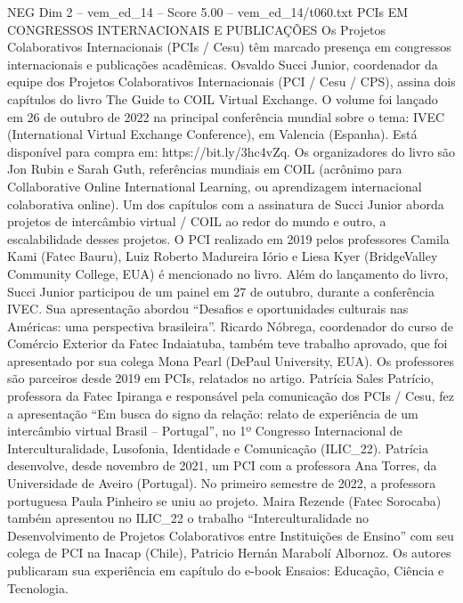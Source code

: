 \begin{textsample}{NEG Dim 2 – vem\_ed\_14 – Score 5.00 – vem\_ed\_14/t060.txt}  \label{ex:f2_neg_072}
PCIs EM CONGRESSOS INTERNACIONAIS E PUBLICAÇÕES Os Projetos Colaborativos Internacionais (PCIs / Cesu) têm marcado presença em congressos internacionais e publicações acadêmicas.
Osvaldo Succi Junior, coordenador da equipe dos Projetos Colaborativos Internacionais (PCI / Cesu / CPS), assina dois capítulos do livro The Guide to COIL Virtual Exchange.
O volume foi lançado em 26 de outubro de 2022 na principal conferência mundial sobre o tema: IVEC (International Virtual Exchange Conference), em Valencia (Espanha).
Está disponível para compra em: https://bit.ly/3hc4vZq.
Os organizadores do livro são Jon Rubin e Sarah Guth, referências mundiais em COIL (acrônimo para Collaborative Online International Learning, ou aprendizagem internacional colaborativa online).
Um dos capítulos com a assinatura de Succi Junior aborda projetos de intercâmbio virtual / COIL ao redor do mundo e outro, a escalabilidade desses projetos.
O PCI realizado em 2019 pelos professores Camila Kami (Fatec Bauru), Luiz Roberto Madureira Iório e Liesa Kyer (BridgeValley Community College, EUA) é mencionado no livro.
Além do lançamento do livro, Succi Junior participou de um painel em 27 de outubro, durante a conferência IVEC.
Sua apresentação abordou “Desafios e oportunidades culturais nas Américas: uma perspectiva brasileira”.
Ricardo Nóbrega, coordenador do curso de Comércio Exterior da Fatec Indaiatuba, também teve trabalho aprovado, que foi apresentado por sua colega Mona Pearl (DePaul University, EUA).
Os professores são parceiros desde 2019 em PCIs, relatados no artigo.
Patrícia Sales Patrício, professora da Fatec Ipiranga e responsável pela comunicação dos PCIs / Cesu, fez a apresentação “Em busca do signo da relação: relato de experiência de um intercâmbio virtual Brasil – Portugal”, no 1º Congresso Internacional de Interculturalidade, Lusofonia, Identidade e Comunicação (ILIC\_22).
Patrícia desenvolve, desde novembro de 2021, um PCI com a professora Ana Torres, da Universidade de Aveiro (Portugal).
No primeiro semestre de 2022, a professora portuguesa Paula Pinheiro se uniu ao projeto.
Maira Rezende (Fatec Sorocaba) também apresentou no ILIC\_22 o trabalho “Interculturalidade no Desenvolvimento de Projetos Colaborativos entre Instituições de Ensino” com seu colega de PCI na Inacap (Chile), Patricio Hernán Marabolí Albornoz.
Os autores publicaram sua experiência em capítulo do e-book Ensaios: Educação, Ciência e Tecnologia.

\end{textsample}
